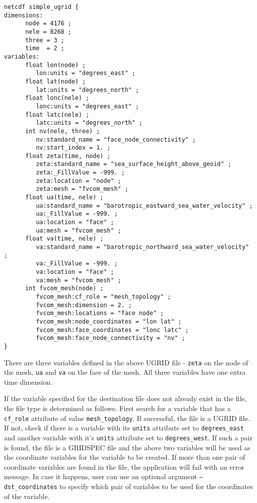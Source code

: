 \label{ugridexample}
\begin{verbatim}
netcdf simple_ugrid {
dimensions:
      node = 4176 ; 
      nele = 8268 ;
      three = 3 ;
      time  = 2 ;
variables:
      float lon(node) ;
         lon:units = "degrees_east" ;
      float lat(node) ;
         lat:units = "degrees_north" ;
      float lonc(nele) ;
         lonc:units = "degrees_east" ;
      float latc(nele) ;
         latc:units = "degrees_north" ;
      int nv(nele, three) ;
         nv:standard_name = "face_node_connectivity" ;
         nv:start_index = 1. ;
      float zeta(time, node) ;
         zeta:standard_name = "sea_surface_height_above_geoid" ;
         zeta:_FillValue = -999. ;
         zeta:location = "node" ;
         zeta:mesh = "fvcom_mesh" ;
      float ua(time, nele) ;
         ua:standard_name = "barotropic_eastward_sea_water_velocity" ;
         ua:_FillValue = -999. ;
         ua:location = "face" ;
         ua:mesh = "fvcom_mesh" ;
      float va(time, nele) ;
         va:standard_name = "barotropic_northward_sea_water_velocity" ;
         va:_FillValue = -999. ;
         va:location = "face" ;
         va:mesh = "fvcom_mesh" ;
      int fvcom_mesh(node) ;
         fvcom_mesh:cf_role = "mesh_topology" ;
         fvcom_mesh:dimension = 2. ;
         fvcom_mesh:locations = "face node" ;
         fvcom_mesh:node_coordinates = "lon lat" ;
         fvcom_mesh:face_coordinates = "lonc latc" ;
         fvcom_mesh:face_node_connectivity = "nv" ;
}
\end{verbatim}

There are three variables defined in the above UGRID file - {\tt zeta} on the node of the mesh, {\tt ua} and
{\tt va} on the face of the mesh.  All three variables have one extra time dimension.  

If the variable specified for the destination file does not already exist in the file, the file type is determined as follows:  
First search for a variable that has a {\tt cf\_role} attribute of value {\tt mesh\_topology}.  If successful,
the file is a UGRID file.  If not, check if there is a variable with its {\tt units} attribute set to {\tt degrees\_east} and another variable with it's {\tt units} attribute set to {\tt degrees\_west}.  If such a pair is found, 
the file is a GRIDSPEC file and the above two variables will be used as the coordinate variables for the 
variable to be created.  If more than one pair of coordinate variables are found in the file, the application 
will fail with an error message.  In case it happens, user can use an optional argument 
{\tt --dst\_coordinates} to specify which pair of variables to be used for the coordinates of the variable.

